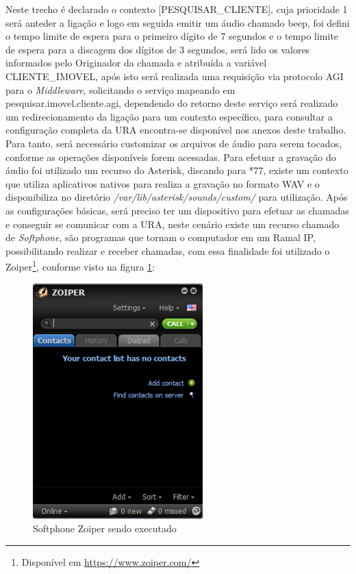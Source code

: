 Neste trecho é declarado o contexto [PESQUISAR\_CLIENTE], cuja prioridade 1 será anteder a ligação e logo em seguida emitir um áudio chamado beep, foi defini o tempo limite de espera para o primeiro dígito de 7 segundos e o tempo limite de espera para a discagem dos dígitos de 3 segundos, será lido os valores informados pelo Originador da chamada e atribuída a variável CLIENTE\_IMOVEL, após isto será realizada uma requisição via protocolo AGI para o \textit{Middleware}, solicitando o serviço mapeando em pesquisar.imovel.cliente.agi, dependendo do retorno deste serviço será realizado um redirecionamento da ligação para um contexto específico, para consultar a configuração completa da URA encontra-se disponível nos anexos deste trabalho.
Para tanto, será necessário customizar os arquivos de áudio para serem tocados, conforme as operações disponíveis forem acessadas. Para efetuar a gravação do áudio foi utilizado um recurso do Asterisk, discando para *77, existe um contexto que utiliza aplicativos nativos para realiza a gravação no formato WAV e o disponibiliza no diretório \textit{/var/lib/asterisk/sounds/custom/} para utilização.
Após as configurações básicas, será preciso ter um dispositivo para efetuar as chamadas e conseguir se comunicar com a URA, neste cenário existe um recurso chamado de \textit{Softphone}, são programas que tornam o computador em um Ramal IP, possibilitando realizar e receber chamadas, com essa finalidade foi utilizado o Zoiper\footnote{Disponível em \url{https://www.zoiper.com/}}, conforme visto na figura \ref{figura:zoiper}:

\begin{figure}[!htb]
	\centering
	\caption{Softphone Zoiper sendo executado}	
	\label{figura:zoiper}
	\includegraphics{figuras/zoiper.png}
\end{figure}


